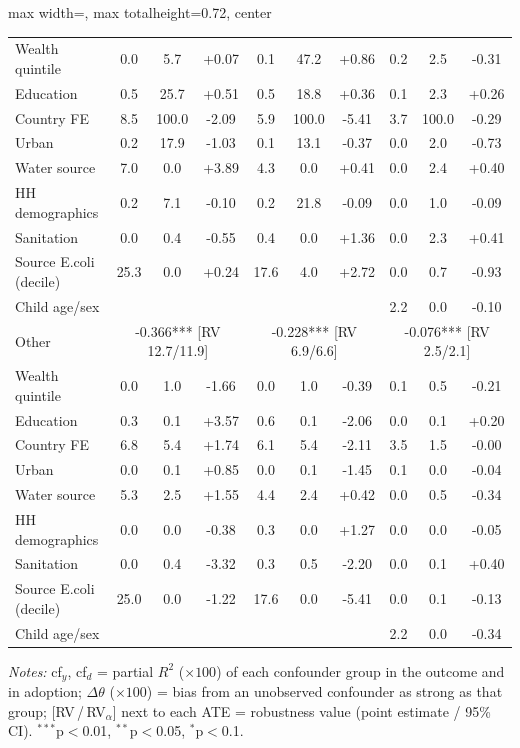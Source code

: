 \begin{landscape}
\begin{table}[htbp]
\begin{adjustbox}{max width=\linewidth, max totalheight=0.72\textwidth, center}
\begin{tabular}{l|ccc|ccc|ccc}
\quad Wealth quintile & 0.0 & 5.7 & +0.07 & 0.1 & 47.2 & +0.86 & 0.2 & 2.5 & -0.31 \\
\quad Education & 0.5 & 25.7 & +0.51 & 0.5 & 18.8 & +0.36 & 0.1 & 2.3 & +0.26 \\
\quad Country FE & 8.5 & 100.0 & -2.09 & 5.9 & 100.0 & -5.41 & 3.7 & 100.0 & -0.29 \\
\quad Urban & 0.2 & 17.9 & -1.03 & 0.1 & 13.1 & -0.37 & 0.0 & 2.0 & -0.73 \\
\quad Water source & 7.0 & 0.0 & +3.89 & 4.3 & 0.0 & +0.41 & 0.0 & 2.4 & +0.40 \\
\quad HH demographics & 0.2 & 7.1 & -0.10 & 0.2 & 21.8 & -0.09 & 0.0 & 1.0 & -0.09 \\
\quad Sanitation & 0.0 & 0.4 & -0.55 & 0.4 & 0.0 & +1.36 & 0.0 & 2.3 & +0.41 \\
\quad Source E.coli (decile) & 25.3 & 0.0 & +0.24 & 17.6 & 4.0 & +2.72 & 0.0 & 0.7 & -0.93 \\
\quad Child age/sex &  &  &  &  &  &  & 2.2 & 0.0 & -0.10 \\
\midrule
Other & \multicolumn{3}{c|}{-0.366*** {\scriptsize[RV 12.7/11.9]}} & \multicolumn{3}{c|}{-0.228*** {\scriptsize[RV 6.9/6.6]}} & \multicolumn{3}{c}{-0.076*** {\scriptsize[RV 2.5/2.1]}} \\
\quad Wealth quintile & 0.0 & 1.0 & -1.66 & 0.0 & 1.0 & -0.39 & 0.1 & 0.5 & -0.21 \\
\quad Education & 0.3 & 0.1 & +3.57 & 0.6 & 0.1 & -2.06 & 0.0 & 0.1 & +0.20 \\
\quad Country FE & 6.8 & 5.4 & +1.74 & 6.1 & 5.4 & -2.11 & 3.5 & 1.5 & -0.00 \\
\quad Urban & 0.0 & 0.1 & +0.85 & 0.0 & 0.1 & -1.45 & 0.1 & 0.0 & -0.04 \\
\quad Water source & 5.3 & 2.5 & +1.55 & 4.4 & 2.4 & +0.42 & 0.0 & 0.5 & -0.34 \\
\quad HH demographics & 0.0 & 0.0 & -0.38 & 0.3 & 0.0 & +1.27 & 0.0 & 0.0 & -0.05 \\
\quad Sanitation & 0.0 & 0.4 & -3.32 & 0.3 & 0.5 & -2.20 & 0.0 & 0.1 & +0.40 \\
\quad Source E.coli (decile) & 25.0 & 0.0 & -1.22 & 17.6 & 0.0 & -5.41 & 0.0 & 0.1 & -0.13 \\
\quad Child age/sex &  &  &  &  &  &  & 2.2 & 0.0 & -0.34 \\
\bottomrule
\end{tabular}
\end{adjustbox}
\par\vspace{3pt}
\begin{minipage}{\linewidth}\footnotesize \textit{Notes:} cf$_y$, cf$_d$ = partial $R^2$ ($\times100$) of each confounder group in the outcome and in adoption; $\Delta\theta$ ($\times100$) = bias from an unobserved confounder as strong as that group; [RV\,/\,RV$_\alpha$] next to each ATE = robustness value (point estimate / 95\% CI). $^{***}$p$<$0.01, $^{**}$p$<$0.05, $^{*}$p$<$0.1.\end{minipage}
\end{table}
\end{landscape}
